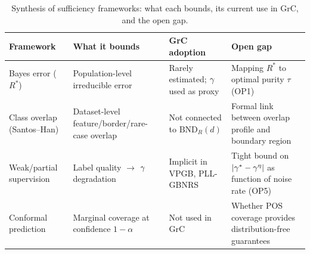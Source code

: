 \begin{table}[pos=!htbp]
\caption{Synthesis of sufficiency frameworks: what each bounds, its current
use in GrC, and the open gap.}
\label{tab:sufficiency_synth}
\centering\small
\begin{tabular}{p{3.0cm}p{3.8cm}p{3.0cm}p{4.5cm}}
\toprule
Framework & What it bounds & GrC adoption & Open gap \\
\midrule
Bayes error ($R^*$)
  & Population-level irreducible error
  & Rarely estimated; $\gamma$ used as proxy
  & Mapping $R^*$ to optimal purity $\tau$ (OP1) \\
\addlinespace
Class overlap (Santos--Han)
  & Dataset-level feature/border/rare-case overlap
  & Not connected to $\mathrm{BND}_R(d)$
  & Formal link between overlap profile and boundary region \\
\addlinespace
Weak/partial supervision
  & Label quality $\to$ $\gamma$ degradation
  & Implicit in VPGB, PLL-GBNRS
  & Tight bound on $|\gamma^* - \gamma^\eta|$ as function of noise rate (OP5) \\
\addlinespace
Conformal prediction
  & Marginal coverage at confidence $1{-}\alpha$
  & Not used in GrC
  & Whether POS coverage provides distribution-free guarantees \\
\bottomrule
\end{tabular}
\end{table}
